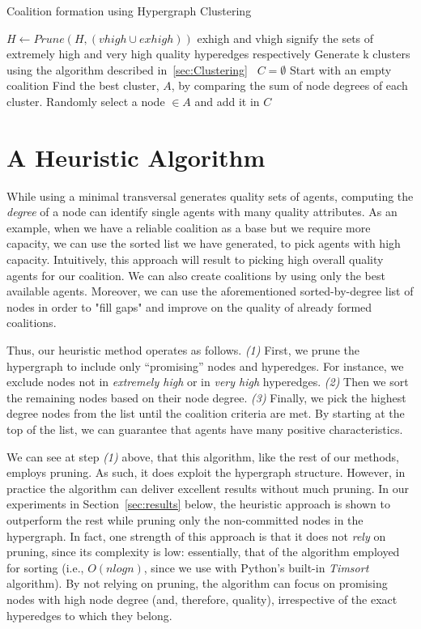 \begin{algorithm}
	\caption{Coalition formation using Hypergraph Clustering}\label{alg:clustering}
	\begin{algorithmic}[1]
		\State $H \gets Prune(H, (vhigh \cup exhigh))$ \Comment exhigh and vhigh signify the sets of extremely high and very high quality hyperedges respectively
		\State Generate k clusters using the algorithm described in~\ref{sec:Clustering}~\cite{zhou2006learning}
		\State $C = \emptyset$ \Comment Start with an empty coalition
		\State Find the best cluster, $A$, by comparing the sum of node degrees of each cluster.
		\State Randomly select a node $\in A $ and add it in $C$
		\EndWhile        
		
		\EndProcedure
	\end{algorithmic}
\end{algorithm}

\section{A Heuristic Algorithm} \label{sec:heuristic}
While using a minimal transversal generates quality sets of agents, computing the {\em degree} of a node can identify single agents with many quality attributes. As an example, when we have a reliable coalition as a base but we require more capacity, we can use the sorted list we have generated, to pick agents with high capacity. Intuitively, this approach will result to picking high overall quality agents for our coalition. We can also create coalitions by using only the best available agents. Moreover, we can use the aforementioned sorted-by-degree list of nodes in order to "fill gaps" and improve on the quality of already formed coalitions. 

Thus, our heuristic method operates as follows. {\em (1)} First, we prune the hypergraph to include only ``promising'' nodes and hyperedges. For instance, we exclude nodes not in {\em extremely high} or in {\em very high} hyperedges. {\em (2)} Then we sort the remaining nodes based on their node degree. {\em (3)}  Finally, we pick the highest degree nodes from the list until the coalition criteria are met. By starting at the top of the list, we can guarantee that agents have many positive characteristics. 

We can see at step {\em (1)} above, that this algorithm, like the rest of our methods, employs pruning. As such, it does exploit the hypergraph structure. However, in practice the algorithm can deliver excellent results without much pruning. In our experiments in Section~\ref{sec:results} below, the heuristic approach is shown to outperform the rest while pruning only the non-committed nodes in the hypergraph. In fact, one strength of this approach is that it does not {\em rely} on pruning, since its complexity is low: essentially, that of the algorithm employed for sorting (i.e., $O(nlogn)$, since we use with Python's built-in {\em Timsort} algorithm). By not relying on pruning, the algorithm can focus on promising nodes with high node degree (and, therefore, quality), irrespective of the exact hyperedges to which they belong.

